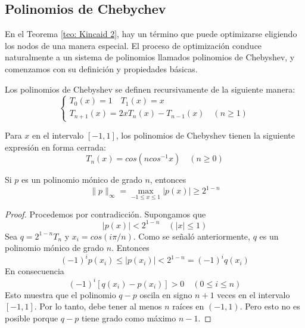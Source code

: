 \subsection{Polinomios de Chebychev}
En el Teorema \ref{teo: Kincaid 2}, hay un término que puede optimizarse eligiendo los nodos de una manera especial. El proceso de optimización conduce naturalmente a un sistema de polinomios llamados polinomios de Chebyshev, y comenzamos con su definición y propiedades básicas.

Los polinomios de Chebyshev se definen recursivamente de la siguiente manera:
\begin{equation}
    \begin{cases}
        T_0 (x) = 1 \quad T_1(x) = x \\
        T_{n + 1}(x) = 2xT_n(x) - T_{n - 1}(x) \quad (n \geq 1)
    \end{cases}
\end{equation}

\begin{theorem}
\label{teo: Kincaid 3}
Para $x$ en el intervalo $[-1, 1]$, los polinomios de Chebyshev tienen la siguiente expresión en forma cerrada:
\[ T_n(x) = cos(n cos^{-1}x) \quad (n \geq 0)\] 
\end{theorem}

\begin{theorem}
\label{teo: Kincaid 4}
Si $p$ es un polinomio mónico de grado $n$, entonces
\[ \|p\|_\infty = \max_{-1 \leq x \leq 1} |p(x)| \geq 2^{1 - n} \]
\end{theorem}

\begin{proof}
Procedemos por contradicción. Supongamos que
\[ |p(x)| < 2^{1 - n} \quad (|x| \leq 1) \]
Sea $q = 2^{1 - n} T_n$ y $x_i = cos(i\pi / n)$. Como se señaló anteriormente, $q$ es un polinomio mónico de grado $n$. Entonces
\[ (-1)^i p(x_i) \leq |p(x_i)| < 2^{1 - n} = (-1)^i q(x_i) \]
En consecuencia
\[ (-1)^i [q(x_i) - p(x_i)] > 0 \quad (0 \leq i \leq n) \]
Esto muestra que el polinomio \( q - p \) oscila en signo \( n+1 \) veces en el intervalo \([-1, 1]\). Por lo tanto, debe tener al menos \( n \) raíces en \((-1, 1)\). Pero esto no es posible porque \( q - p \) tiene grado como máximo \( n - 1 \).
\end{proof}

